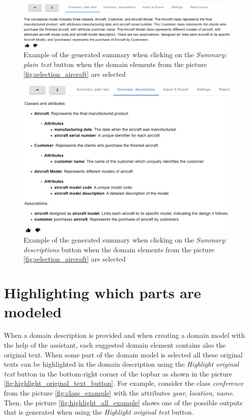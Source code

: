 \begin{figure}[!h]
    \includegraphics[scale=0.37]{../docs/images/frontend/summary-plain-text.png}
    \caption{\centering Example of the generated summary when clicking on the \textit{Summary: plain text} button when the domain elements from the picture \ref{fig:selection_aircraft} are selected}
    \label{fig:summary_plain_text}
\end{figure}

\begin{figure}[!h]
    \includegraphics[scale=0.41]{../docs/images/frontend/summary-descriptions.png}
    \caption{\centering Example of the generated summary when clicking on the \textit{Summary: descriptions} button when the domain elements from the picture \ref{fig:selection_aircraft} are selected}
    \label{fig:summary_description}
\end{figure}

\clearpage

\section{Highlighting which parts are modeled}

When a domain description is provided and when creating a domain model with the help of the assistant, each suggested domain element contains also the original text. When some part of the domain model is selected all these original texts can be highlighted in the domain description using the \textit{Highlight original text} button in the bottom-right corner of the topbar as shown in the picture \ref{fig:highlight_original_text_button}. For example, consider the class \textit{conference} from the picture \ref{fig:class_example} with the attributes \textit{year}, \textit{location}, \textit{name}. Then, the picture \ref{fig:highlight_all_example} shows one of the possible outputs that is generated when using the \textit{Highlight original text} button.

